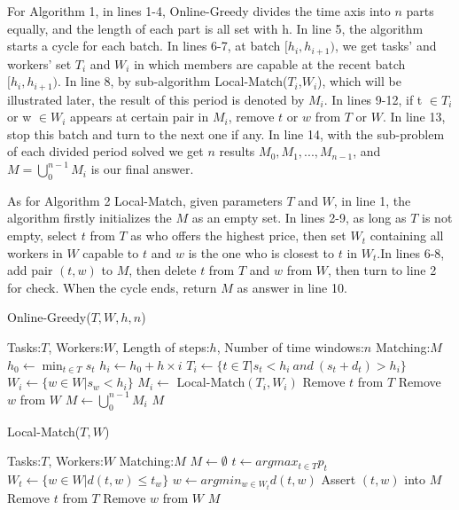 \documentclass[color,twoside,amssymb,twocolumn]{article}
\begin{document}
For Algorithm 1, in lines 1-4, Online-Greedy divides the time axis into $n$ parts equally, and the length of each part is all set with h. In line 5, the algorithm starts a cycle for each batch. In lines 6-7, at batch $[h_i,h_{i+1})$, we get tasks' and workers' set  $T_i$ and $W_i$ in which members are capable at the recent batch $[h_i,h_{i+1})$. In line 8, by sub-algorithm Local-Match($T_i$,$W_i$), which will be illustrated later, the result of this period is denoted by $M_i$. In lines 9-12, if t $\in T_i$ or w $\in W_i$ appears at certain pair in $M_i$, remove $t$ or $w$ from $T$ or $W$. In line 13, stop this batch and turn to the next one if any. In line 14, with the sub-problem of each divided period solved we get $n$ results $M_0,M_1,...,M_{n-1}$, and $M = \bigcup^{n-1}_{0}M_i$ is our final answer.

As for Algorithm 2 Local-Match, given parameters $T$ and $W$, in line 1, the algorithm firstly initializes the $M$ as an empty set. In lines 2-9, as long as $T$ is not empty, select $t$ from $T$ as who offers the highest price, then set $W_t$ containing all workers in $W$ capable to $t$ and $w$ is the one who is closest to $t$ in $W_t$.In lines 6-8, add pair $(t,w)$ to $M$, then delete $t$ from $T$ and $w$ from $W$, then turn to line 2 for check. When the cycle ends, return $M$ as answer in line 10.

\begin{algorithm}[h]
	\caption{Online-Greedy($T,W,h,n$)}
	\label{alg1}
	\begin{algorithmic}[1]
		\REQUIRE Tasks:$T$, Workers:$W$, Length of steps:$h$, Number of time windows:$n$
		\ENSURE Matching:$M$
		\STATE $h_0 \leftarrow \min_{t \in T}s_t$
		\STATE $h_i \leftarrow h_0 + h \times i$
		\ENDFOR
		\STATE $T_i \leftarrow \{t\in T|s_t < h_i\ and\ (s_t+d_t) > h_i\}$ 
		\STATE $W_i \leftarrow \{w\in W|s_w < h_i\}$
		\STATE $M_i \leftarrow$ Local-Match$(T_i,W_i)$
		\STATE Remove $t$ from $T$
		\STATE Remove $w$ from $W$
		\ENDFOR
		\ENDFOR
		\STATE $M \leftarrow \bigcup_{0}^{n-1} M_i$
		\RETURN $M$	
	\end{algorithmic} 
\end{algorithm}


\begin{algorithm}[h]
	\caption{Local-Match($T,W$)}
	\label{alg2}
	\begin{algorithmic}[1]
		\REQUIRE Tasks:$T$, Workers:$W$
		\ENSURE Matching:$M$
		\STATE $M \leftarrow \emptyset$
		\STATE $t \leftarrow argmax_{t\in T}p_t$
		\STATE $W_t \leftarrow \{w\in W|d(t,w)\leq t_w\}$
		\STATE $w \leftarrow argmin_{w\in W_t}d(t,w)$
		\STATE Assert $(t,w)$ into $M$
		\STATE Remove $t$ from $T$
		\STATE Remove $w$ from $W$
		\ENDWHILE
		\RETURN $M$
	\end{algorithmic} 
\end{algorithm}
\end{document}

